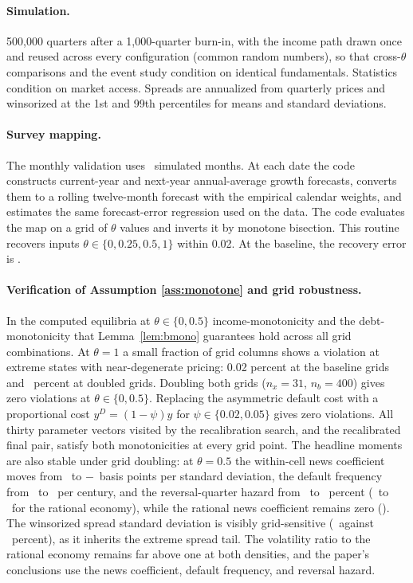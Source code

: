 \documentclass[11pt]{article}
\theoremstyle{definition}
\begin{document}
\paragraph{Simulation.} 500{,}000 quarters after a 1{,}000-quarter burn-in, with the income path drawn once and reused across every configuration (common random numbers), so that cross-$\theta$ comparisons and the event study condition on identical fundamentals. Statistics condition on market access. Spreads are annualized from quarterly prices and winsorized at the 1st and 99th percentiles for means and standard deviations.

\paragraph{Survey mapping.} The monthly validation uses \SurveyMonths\ simulated months. At each date the code constructs current-year and next-year annual-average growth forecasts, converts them to a rolling twelve-month forecast with the empirical calendar weights, and estimates the same forecast-error regression used on the data. The code evaluates the map on a grid of $\theta$ values and inverts it by monotone bisection. This routine recovers inputs $\theta\in\{0,0.25,0.5,1\}$ within 0.02. At the baseline, the recovery error is \SurveyRecoveryError.

\paragraph{Verification of Assumption \ref{ass:monotone} and grid robustness.} In the computed equilibria at $\theta \in \{0, 0.5\}$ income-monotonicity and the debt-monotonicity that Lemma~\ref{lem:bmono} guarantees hold across all grid combinations. At $\theta = 1$ a small fraction of grid columns shows a violation at extreme states with near-degenerate pricing: 0.02 percent at the baseline grids and \MonoViolGDOnepct\ percent at doubled grids. Doubling both grids ($n_x = 31$, $n_b = 400$) gives zero violations at $\theta \in \{0, 0.5\}$. Replacing the asymmetric default cost with a proportional cost $y^D = (1-\psi)y$ for $\psi \in \{0.02, 0.05\}$ gives zero violations. All thirty parameter vectors visited by the recalibration search, and the recalibrated final pair, satisfy both monotonicities at every grid point. The headline moments are also stable under grid doubling: at $\theta = 0.5$ the within-cell news coefficient moves from \NewsBpDiag\ to $-$\NewsBpDiagGD\ basis points per standard deviation, the default frequency from \DefFreqDiag\ to \DefFreqDiagGD\ per century, and the reversal-quarter hazard from \HazPeakDiag\ to \HazPeakDiagGD\ percent (\HazPeakRE\ to \HazPeakREGD\ for the rational economy), while the rational news coefficient remains zero (\NewsBpREGD). The winsorized spread standard deviation is visibly grid-sensitive (\SprSdDiag\ against \SprSdDiagGD\ percent), as it inherits the extreme spread tail. The volatility ratio to the rational economy remains far above one at both densities, and the paper's conclusions use the news coefficient, default frequency, and reversal hazard.
\end{document}
